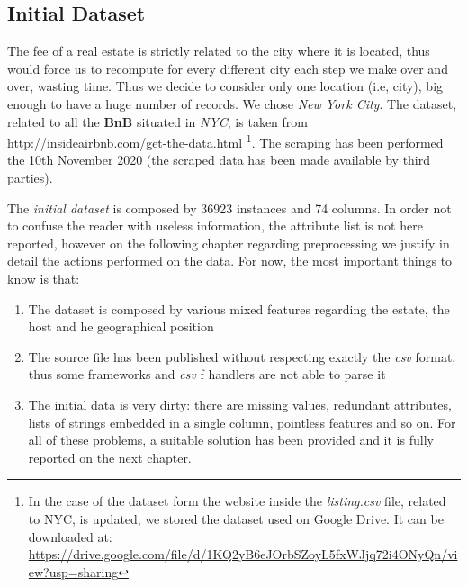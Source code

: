 \subsection{Initial Dataset}
The fee of a real estate is strictly related to the city where it is located, thus would force us to recompute for every different city each step we make over and over, wasting time. Thus we decide to consider only one location (i.e, city), big enough to have a huge number of records. We chose \textit{New York City}.
The dataset, related to all the \textbf{BnB} situated in \textit{NYC}, is taken from \url{http://insideairbnb.com/get-the-data.html} \footnote{In the case of the dataset form the website inside the \textit{listing.csv} file, related to NYC, is updated, we stored the dataset used on Google Drive. It can be downloaded at: \url{https://drive.google.com/file/d/1KQ2yB6eJOrbSZoyL5fxWJjq72i4ONyQn/view?usp=sharing}}. The scraping has been performed the 10th November 2020 (the scraped data has been made available by third parties).

The \textit{initial dataset} is composed by 36923 instances and 74 columns. In order not to confuse the reader with useless information, the attribute list is not here reported, however on the following chapter regarding preprocessing we justify in detail the actions performed on the data. For now, the most important things to know is that:

\begin{enumerate}
	\item The dataset is composed by various mixed features regarding the estate, the host and he geographical position
	\item The source file has been published without respecting exactly the \textit{csv} format, thus some frameworks and \textit{csv} f handlers are not able to parse it
	\item The initial data is very dirty: there are missing values, redundant attributes, lists of strings embedded in a single column, pointless features and so on. For all of these problems, a suitable solution has been provided and it is fully reported on the next chapter.
\end{enumerate}

\medskip 

